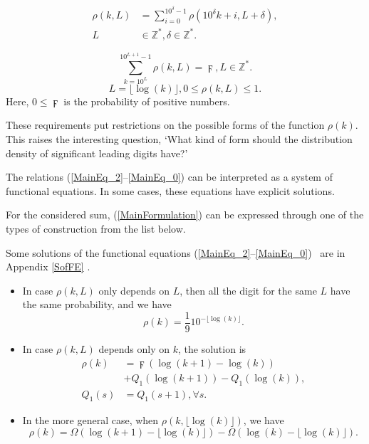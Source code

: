\documentclass[titlepage,fleqn]{article}%
\providecommand{\U}[1]{\protect\rule{.1in}{.1in}}
\begin{document}
\begin{align}
\rho(k,L)  &  =%
{\displaystyle\sum\limits_{i=0}^{10^{\delta}-1}}
\rho(10^{\delta}k+i,L+\delta),\label{MainEq_2}\\
L  &  \in%
\mathbb{Z}
^{\ast},\delta\in%
\mathbb{Z}
^{\ast}.\nonumber
\end{align}
%

\begin{equation}%
{\displaystyle\sum\limits_{k=10^{L}}^{10^{L+1}-1}}
\rho(k,L)=\digamma,L\in%
\mathbb{Z}
^{\ast}. \label{MainEq_0}%
\end{equation}%
\[
L=\lfloor\log(k)\rfloor,0\leq\rho(k,L)\leq1.
\]
\noindent Here, $0\leq\digamma$ is the probability of positive numbers.

These requirements put restrictions on the possible forms of the function
$\rho(k)$. This raises the interesting question, `What kind of form should the
distribution density of significant leading digits have?'

The relations (\ref{MainEq_2}--\ref{MainEq_0}) can be interpreted as a system
of functional equations. In some cases, these equations have explicit solutions.

For the considered sum, (\ref{MainFormulation}) can be expressed through one
of the types of construction from the list below.

Some solutions of the functional equations (\ref{MainEq_2}--\ref{MainEq_0})
\ are in Appendix
\ref{SofFE}%
.

\begin{itemize}
\item In case $\rho(k,L)$ only depends on $L$, then all the digit for the same
$L$ have the same probability, and we have%
\begin{equation}
\rho(k)=\frac{1}{9}10^{-\lfloor\log(k)\rfloor}. \label{S1}%
\end{equation}


\item In case $\rho(k,L)$ depends only on $k$, the solution is%
\begin{align}
\rho(k)  &  =\digamma\left(  \log(k+1)-\log(k)\right) \label{S2}\\
&  +Q_{1}(\log(k+1))-Q_{1}(\log(k)),\nonumber\\
Q_{1}(s)  &  =Q_{1}(s+1),\forall s.\nonumber
\end{align}


\item In the more general case, when $\rho(k,\lfloor\log(k)\rfloor)$, we have%
\begin{equation}
\rho(k)=\Omega(\log(k+1)-\lfloor\log(k)\rfloor)-\Omega(\log(k)-\lfloor
\log(k)\rfloor). \label{S3}%
\end{equation}

\end{itemize}
\end{document}
